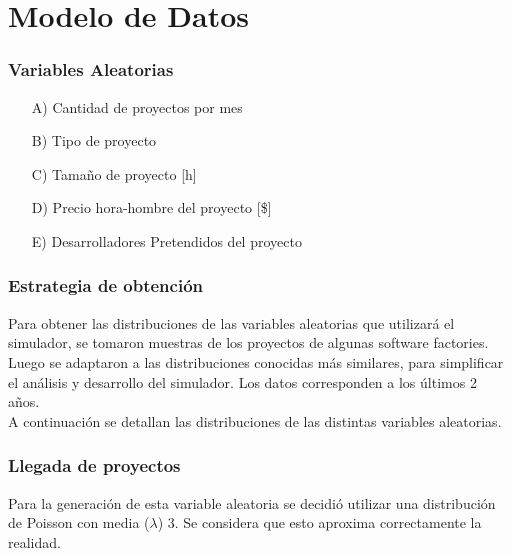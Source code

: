 \part*{Modelo de Datos}

\section{Variables Aleatorias}

\begin{itemize}
    \item[A)] Cantidad de proyectos por mes
    \item[B)] Tipo de proyecto
    \item[C)] Tamaño de proyecto [h]
    \item[D)] Precio hora-hombre del proyecto [\$]
    \item[E)] Desarrolladores Pretendidos del proyecto
\end{itemize}

\section{Estrategia de obtención}

Para obtener las distribuciones de las variables aleatorias que utilizará el simulador, se tomaron muestras de los proyectos de algunas software factories. Luego se 
adaptaron a las distribuciones conocidas más similares, para simplificar el análisis y desarrollo del simulador. Los datos corresponden a los últimos 2 años. \\

A continuación se detallan las distribuciones de las distintas variables aleatorias.\\

\section*{Llegada de proyectos}
Para la generación de esta variable aleatoria se decidió utilizar una distribución de Poisson con media ($\lambda$) 3. Se considera que esto aproxima correctamente
la realidad. \\

